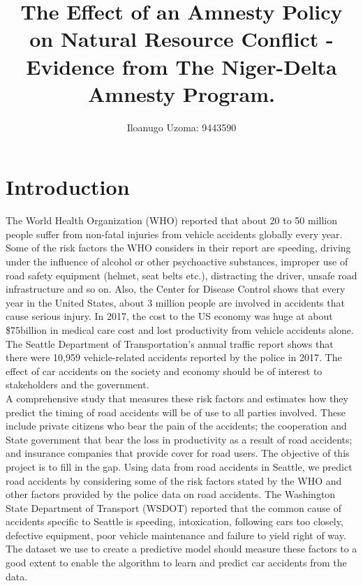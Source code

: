 \documentclass[a4paper,12pt]{article}
\author{Iloanugo Uzoma: 9443590}
\title{The Effect of an Amnesty Policy on Natural Resource Conflict - Evidence from The Niger-Delta Amnesty Program.}
\begin{document}
\section{Introduction}
The World Health Organization (WHO) reported that about 20 to 50 million people suffer from non-fatal injuries from vehicle accidents globally every year. Some of the risk factors the WHO considers in their report are speeding, driving under the influence of alcohol or other psychoactive substances, improper use of road safety equipment (helmet, seat belts etc.), distracting the driver, unsafe road infrastructure and so on. Also, the Center for Disease Control shows that every year in the United States, about 3 million people are involved in accidents that cause serious injury. In 2017, the cost to the US economy was huge at about \$75billion in medical care cost and lost productivity from vehicle accidents alone. The Seattle Department of Transportation’s annual traffic report shows that there were 10,959 vehicle-related accidents reported by the police in 2017. The effect of car accidents on the society and economy should be of interest to stakeholders and the government.\\

A comprehensive study that measures these risk factors and estimates how they predict the timing of road accidents will be of use to all parties involved. These include private citizens who bear the pain of the accidents; the cooperation and State government that bear the loss in productivity as a result of road accidents; and insurance companies that provide cover for road users. The objective of this project is to fill in the gap. Using data from road accidents in Seattle, we predict road accidents by considering some of the risk factors stated by the WHO and other factors provided by the police data on road accidents. The Washington State Department of Transport (WSDOT) reported that the common cause of accidents specific to Seattle is speeding, intoxication, following cars too closely, defective equipment, poor vehicle maintenance and failure to yield right of way. The dataset we use to create a predictive model should measure these factors to a good extent to enable the algorithm to learn and predict car accidents from the data.
\end{document}
